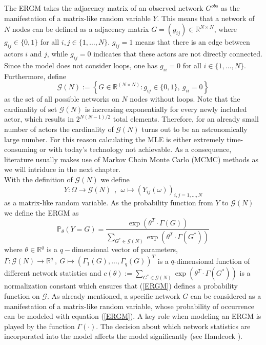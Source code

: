 \documentclass[10pt, conference, compsocconf]{IEEEtran}
\begin{document}
The ERGM takes the adjacency matrix of an observed network $G^{obs}$ as the manifestation of a matrix-like random variable $Y$. This means that a network of $N$ nodes can be defined as a adjacency matrix $G=(g_{ij})\in \mathbb{R}^{N \times N}$, where $g_{ij} \in \{0,1\}$ for all $i,j \in \{1,\dots , N\}$. $g_{ij}=1$ means that there is an edge between actors $i$ and $j$, while $g_{ij}=0$ indicates that these actors are not directly connected. Since the model does not consider loops, one has $g_{ii}=0$ for all $i \in \{1,\dots , N\}$. Furthermore, define
$$ \mathcal{G}(N) := \left\{ G \in \mathbb{R}^{(N \times N)}: g_{ij} \in \{0,1\},~g_{ii}=0\right\}$$
as the set of all possible networks on $N$ nodes without loops. Note that the cardinality of set $\mathcal{G}(N)$ is increasing exponentially for every newly included actor, which results in $2^{N(N-1)/2}$ total elements. Therefore, for an already small number of actors the cardinality of $\mathcal{G}(N)$ turns out to be an astronomically large number. For this reason calculating the MLE is either extremely time-consuming or with today's technology not achievable. As a consequence, literature usually makes use of Markov Chain Monte Carlo (MCMC) methods as we will intriduce in the next chapter.\\  
With the definition of $\mathcal{G}(N)$ we define 
$$Y: \Omega \to \mathcal{G}(N)~~,~~\omega \mapsto (Y_{ij}(\omega))_{i,j=1,\dots,N}$$
as a matrix-like random variable. As the probability function from $Y$ to $\mathcal{G}(N)$ we define the ERGM as
\begin{equation}
\mathbb{P}_{\theta}(Y=G)=\dfrac{\exp(\theta^T \cdot \Gamma(G))}{\sum_{G^* \in \mathcal{G}(N)} \exp(\theta^T \cdot \Gamma(G^*))} 
\label{ERGM}
\end{equation}
%
where $\theta \in \mathbb{R}^q$ is a $q-$dimensional vector of parameters, $\Gamma:\mathcal{G}(N) \to \mathbb{R}^q~,~G \mapsto (\Gamma_1(G),\dots,\Gamma_q(G))^T$ is a $q$-dimensional function of different network statistics and $c(\theta):= \sum_{G^* \in \mathcal{G}(N)} \exp(\theta^T \cdot \Gamma(G^*))$ is a normalization constant which ensures that (\ref{ERGM}) defines a probability function on $\mathcal{G}$.
%
As already mentioned, a specific network $G$ can be considered as a manifestation of a matrix-like random variable, whose probability of occurrence can be modeled with equation (\ref{ERGM}).
A key role when modeling an ERGM is played by the function $\Gamma(\cdot)$. The decision about which network statistics are incorporated into the model affects the model significantly (see Handcock \cite{Handcock.2003}).
\end{document}
